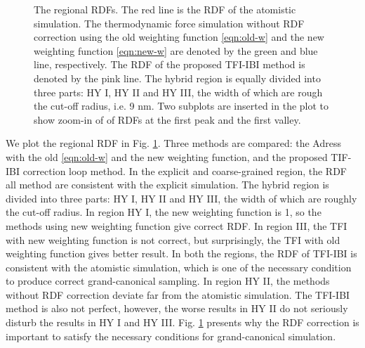 \documentclass[aps,pre,preprint,unsortedaddress]{revtex4}
\newcommand{\redc}[1]{{\color{red} #1}}
\begin{document}
\begin{figure}
  \caption{The regional RDFs. The red line is the RDF of the atomistic
    simulation. The thermodynamic force simulation without RDF
    correction using the old weighting function \eqref{eqn:old-w} and
    the new weighting function \eqref{eqn:new-w} are denoted by the
    green and blue line, respectively. The RDF of the proposed TFI-IBI
    method is denoted by the pink line. The hybrid region is equally
    divided into three parts: HY I, HY II and HY III, the width of
    which are rough the cut-off radius, i.e. 9 \textsf{nm}. Two
    subplots are inserted in the plot to show zoom-in of of RDFs at
    the first peak and the first valley.  }
  \label{fig:tmp7}
\end{figure}


We plot the regional RDF in Fig. \ref{fig:tmp7}. Three methods are
compared: the Adress with the old \eqref{eqn:old-w} and the new
weighting function, and the proposed TIF-IBI correction loop
method. In the explicit and coarse-grained region, the RDF all method
are consistent with the explicit simulation. The hybrid region is
divided into three parts: HY I, HY II and HY III, the width of which
are roughly the cut-off radius. In region HY I, the new weighting
function is 1, so the methods using new weighting function give
correct RDF. In region III, the TFI with new weighting function is not
correct, but surprisingly, the TFI with old weighting function gives
better result. In both the regions, the RDF of TFI-IBI is consistent
with the atomistic simulation, which is one of the necessary condition
to produce correct grand-canonical sampling.  In region HY II, the
methods without RDF correction deviate far from the atomistic
simulation. The TFI-IBI method is also not perfect, however, the worse
results in HY II do not seriously disturb the results in HY I and HY
III. Fig. \ref{fig:tmp7} presents why the RDF correction is important
to satisfy the necessary conditions for grand-canonical simulation.




{}

\end{document}
